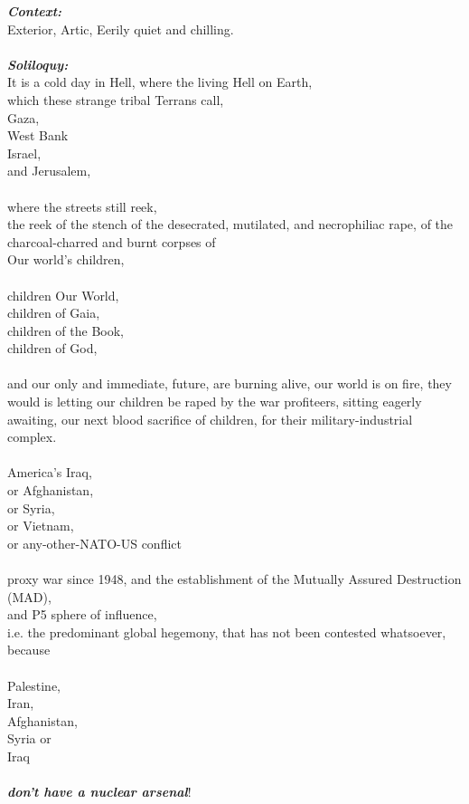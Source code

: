 \documentclass[16pt,openany,oneside]{book}
\begin{document}
\noindent\textit{\textbf{Context:}} \\ 
Exterior, Artic, Eerily quiet and chilling. 
\\\\ 
\textit{\textbf{Soliloquy:}} \\ 
It is a cold day in Hell, where the living Hell on Earth,  \\ 
which these strange tribal Terrans call,  \\ 
Gaza,  \\ 
West Bank  \\ 
Israel,  \\ 
and Jerusalem,  
\\\\
where the streets still reek, \\ 
the reek of the stench of the desecrated, mutilated, and necrophiliac rape, of the charcoal-charred and burnt corpses of  \\
Our world's children, 
\\\\ 
children Our World,  \\ 
children of Gaia,  \\ 
children of the Book, \\ 
children of God,  
\\\\ 
and our only and immediate, future, are burning alive, our world is on fire, they would is letting our children be raped by the war profiteers, sitting eagerly awaiting, our next blood sacrifice of children, for their military-industrial complex. 
\\\\ 
America's Iraq,  \\ 
or Afghanistan, \\ 
 or Syria,  \\ 
or Vietnam,  \\ 
or any-other-NATO-US conflict
\\\\ 
proxy war since 1948, and the establishment of the Mutually Assured Destruction (MAD), \\  
and P5 sphere of influence, \\ 
i.e. the predominant global hegemony, that has not been contested whatsoever,  \\ 
because 
\\\\ 
Palestine,  \\ 
Iran,  \\ 
Afghanistan,  \\ 
Syria or  \\ 
Iraq  
\\\\ 
\textit{\textbf{don't have a nuclear arsenal}}! 
\end{document}
